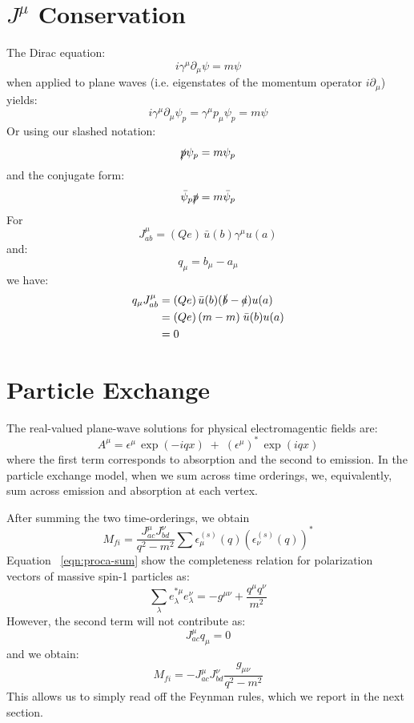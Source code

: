 \documentclass[12pt]{article}
\begin{document}
\section{$J^\mu$ Conservation}

The Dirac equation:
\begin{equation*}
i \gamma^\mu \partial_\mu \psi = m\psi
\end{equation*}
when applied to plane waves (i.e. eigenstates of the momentum operator
$i \partial_\mu$) yields:
$$i \gamma^\mu \partial_\mu \psi_p = \gamma^\mu p_\mu \psi_p
= m \psi$$
Or using our slashed notation:
\begin{equation}
\slashed{p} \psi_p = m \psi_p
\end{equation}
and the conjugate form:
\begin{equation}
\bar{\psi}_p \slashed{p} = m \bar{\psi}_p
\end{equation}
For 
$$J^\mu_{ab} = (Qe) \, \bar{u}(b) \gamma^\mu u(a)$$
and:
$$q_\mu = b_\mu - a_\mu$$
we have:
\begin{align*}
q_\mu J^\mu_{ab} &= (Qe) \, \bar{u}(b) (\slashed{b} - \slashed{a}) u(a) \\
 &= (Qe) \, (m-m) \; \bar{u}(b) u(a) \\
 &= 0\\
\end{align*}

\section{Particle Exchange}

The real-valued plane-wave solutions for physical electromagentic fields are:
\begin{equation*}
A^\mu = \epsilon^\mu \, \exp(-iq x) \; + \; (\epsilon^{\mu})^* \, \exp(iq x)
\end{equation*}
where the first term corresponds to absorption and the second to
emission.  In the particle exchange model, when we sum across time
orderings, we, equivalently, sum across emission and absorption at
each vertex.

After summing the two time-orderings, we obtain
\begin{equation}
  M_{fi} = \frac{J_{ac}^\mu J_{bd}^\nu}{q^2 - m^2}
  \sum \epsilon^{(s)}_\mu(q) (\epsilon^{(s)}_\nu(q))^*
\end{equation}
Equation ~\ref{eqn:proca-sum} show the completeness relation for polarization vectors of massive spin-1 particles as:
$$\sum_\lambda e^{*\mu}_\lambda e^\nu_\lambda = -g^{\mu\nu} + \frac{q^\mu q^\nu}{m^2}$$
However, the second term will not contribute as:
$$J_{ac}^\mu q_\mu = 0$$
and we obtain:
\begin{equation}
  M_{fi} = -J_{ac}^\mu J_{bd}^\nu \frac{g_{\mu \nu}}{q^2 - m^2}
\end{equation}
This allows us to simply read off the Feynman rules, which we report in the next section.\\
\end{document}
